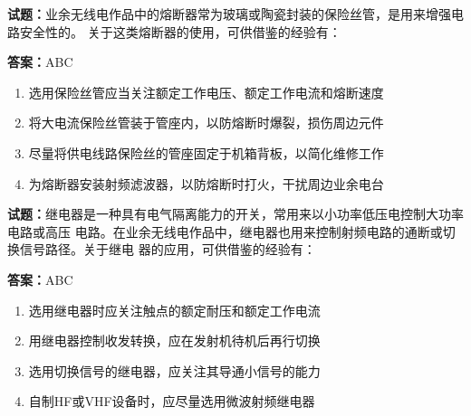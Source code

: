 \documentclass{ctexbook}
\begin{document}




\vspace{1em}

\textbf{试题：}业余无线电作品中的熔断器常为玻璃或陶瓷封装的保险丝管，是用来增强电路安全性的。
关于这类熔断器的使用，可供借鉴的经验有： 

\textbf{答案：}ABC 

\begin{enumerate}[leftmargin=3em]
  \item 选用保险丝管应当关注额定工作电压、额定工作电流和熔断速度 

  \item 将大电流保险丝管装于管座内，以防熔断时爆裂，损伤周边元件 


  \item 尽量将供电线路保险丝的管座固定于机箱背板，以简化维修工作 

  \item 为熔断器安装射频滤波器，以防熔断时打火，干扰周边业余电台 

\end{enumerate}





\vspace{1em}

\textbf{试题：}继电器是一种具有电气隔离能力的开关，常用来以小功率低压电控制大功率电路或高压
电路。在业余无线电作品中，继电器也用来控制射频电路的通断或切换信号路径。关于继电
器的应用，可供借鉴的经验有： 

\textbf{答案：}ABC 

\begin{enumerate}[leftmargin=3em]
  \item 选用继电器时应关注触点的额定耐压和额定工作电流 

  \item 用继电器控制收发转换，应在发射机待机后再行切换 

  \item 选用切换信号的继电器，应关注其导通小信号的能力 

  \item 自制HF或VHF设备时，应尽量选用微波射频继电器 

\end{enumerate}


\end{document}
